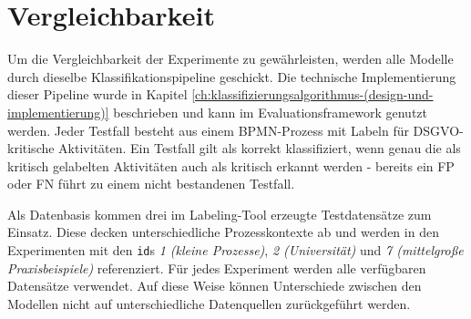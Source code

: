 \section{Vergleichbarkeit}\label{sec:einheitliche-klassifizierungspipeline-und-datensatze}

Um die Vergleichbarkeit der Experimente zu gewährleisten, werden alle Modelle durch dieselbe Klassifikationspipeline geschickt. Die technische Implementierung dieser Pipeline wurde in Kapitel \ref{ch:klassifizierungsalgorithmus-(design-und-implementierung)} beschrieben und kann im Evaluationsframework genutzt werden. Jeder Testfall besteht aus einem \ac{BPMN}-Prozess mit Labeln für \ac{DSGVO}-kritische Aktivitäten. Ein Testfall gilt als korrekt klassifiziert, wenn genau die als kritisch gelabelten Aktivitäten auch als kritisch erkannt werden - bereits ein \ac{FP} oder \ac{FN} führt zu einem nicht bestandenen Testfall.

Als Datenbasis kommen drei im Labeling-Tool erzeugte Testdatensätze zum Einsatz. Diese decken unterschiedliche Prozesskontexte ab und werden in den Experimenten mit den \texttt{id}s \emph{1 (kleine Prozesse)}, \emph{2 (Universität)} und \emph{7 (mittelgroße Praxisbeispiele)} referenziert. Für jedes Experiment werden alle verfügbaren Datensätze verwendet. Auf diese Weise können Unterschiede zwischen den Modellen nicht auf unterschiedliche Datenquellen zurückgeführt werden.